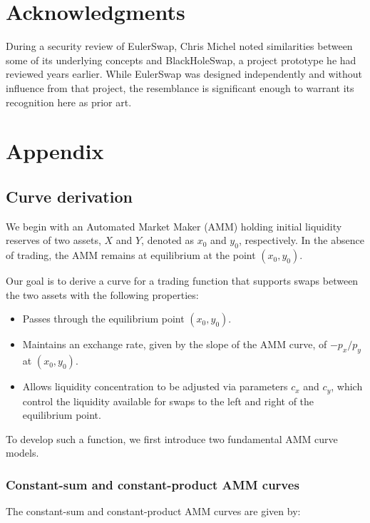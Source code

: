 \documentclass{article}
\begin{document}
\section*{Acknowledgments}

During a security review of EulerSwap, Chris Michel noted similarities between some of its underlying concepts and BlackHoleSwap, a project prototype he had reviewed years earlier. While EulerSwap was designed independently and without influence from that project, the resemblance is significant enough to warrant its recognition here as prior art.

\newpage
\section{Appendix}
\label{sec:appendix}

\subsection{Curve derivation}
\label{sec:curve-derivation}

We begin with an Automated Market Maker (AMM) holding initial liquidity reserves of two assets, $X$ and $Y$, denoted as $x_0$ and $y_0$, respectively. In the absence of trading, the AMM remains at equilibrium at the point $(x_0, y_0)$. 

Our goal is to derive a curve for a trading function that supports swaps between the two assets with the following properties:

\begin{itemize}
    \item Passes through the equilibrium point $(x_0, y_0)$.
    \item Maintains an exchange rate, given by the slope of the AMM curve, of $-p_x / p_y$ at $(x_0, y_0)$.
    \item Allows liquidity concentration to be adjusted via parameters $c_x$ and $c_y$, which control the liquidity available for swaps to the left and right of the equilibrium point.
\end{itemize}

To develop such a function, we first introduce two fundamental AMM curve models.

\subsubsection{Constant-sum and constant-product AMM curves}

The constant-sum and constant-product AMM curves are given by:
\end{document}
